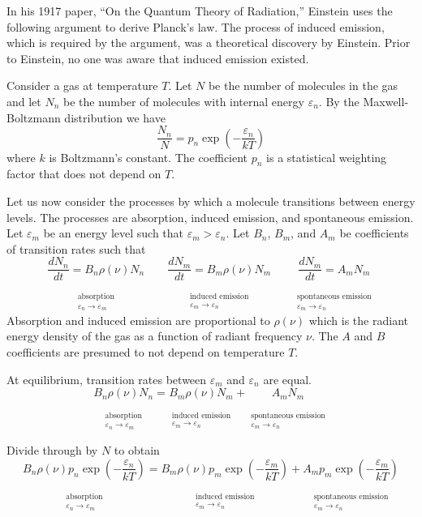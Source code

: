 \documentclass[12pt]{article}
\newcommand\BNM{B_n} %
\newcommand\BMN{B_m} %
\newcommand\AMN{A_m} %
\newcommand\ABSORPTION{\substack{\phantom{0}\\ \text{absorption}\\ \varepsilon_n\rightarrow\varepsilon_m}}
\newcommand\INDUCED{\substack{\phantom{0}\\ \text{induced emission}\\ \varepsilon_m\rightarrow\varepsilon_n}}
\newcommand\SPONTANEOUS{\substack{\phantom{0}\\ \text{spontaneous emission}\\ \varepsilon_m\rightarrow\varepsilon_n}}
\begin{document}
\noindent
In his 1917 paper, ``On the Quantum Theory of Radiation,''
Einstein uses the following argument to derive Planck's law.
The process of induced emission, which is required by the argument, was a theoretical discovery by Einstein.
Prior to Einstein, no one was aware that induced emission existed.

\bigskip
\noindent
Consider a gas at temperature $T$.
Let $N$ be the number of molecules in the gas
and let $N_n$ be the number of molecules with internal energy $\varepsilon_n$.
By the Maxwell-Boltzmann distribution we have
\begin{equation*}
\frac{N_n}{N}=p_n\exp\left(-\frac{\varepsilon_n}{kT}\right)
\end{equation*}
where $k$ is Boltzmann's constant.
The coefficient $p_n$ is a statistical weighting factor that does not depend on $T$.

\bigskip
\noindent
Let us now consider the processes by which a molecule transitions between energy levels.
The processes are absorption, induced emission, and spontaneous emission.
Let $\varepsilon_m$ be an energy level such that $\varepsilon_m>\varepsilon_n$.
Let $\BNM$, $\BMN$, and $\AMN$ be coefficients of transition rates such that
\begin{equation*}
\underset{\ABSORPTION}{\frac{dN_n}{dt}=\BNM\rho(\nu)N_n}
\qquad
\underset{\INDUCED}{\frac{dN_m}{dt}=\BMN\rho(\nu)N_m}
\qquad
\underset{\SPONTANEOUS}{\frac{dN_m}{dt}=\AMN N_m}
\end{equation*}
Absorption and induced emission are proportional to $\rho(\nu)$
which is the radiant energy density of the gas
as a function of radiant frequency $\nu$.
The $A$ and $B$ coefficients are presumed to not depend on temperature $T$.

\bigskip
\noindent
At equilibrium, transition rates between $\varepsilon_m$ and $\varepsilon_n$ are equal.
\begin{equation*}
\underset{\ABSORPTION}{\BNM\rho(\nu)N_n}
=\underset{\INDUCED}{\BMN\rho(\nu)N_m}
+\underset{\SPONTANEOUS}{\AMN N_m}
\end{equation*}

\noindent
Divide through by $N$ to obtain
\begin{equation*}
\underset{\ABSORPTION}{\BNM\rho(\nu)p_n\exp\left(-\frac{\varepsilon_n}{kT}\right)}
=\underset{\INDUCED}{\BMN\rho(\nu)p_m\exp\left(-\frac{\varepsilon_m}{kT}\right)}
+\underset{\SPONTANEOUS}{\AMN p_m\exp\left(-\frac{\varepsilon_m}{kT}\right)}
\end{equation*}
\end{document}
